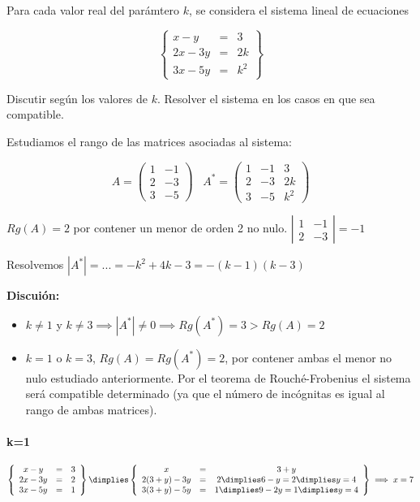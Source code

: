 \documentclass[palatino,nosec,nochap,nobuilddate]{Docencia}
\begin{document}
\begin{problem}[1]
Para cada valor real del parámtero $k$, se considera el sistema lineal de ecuaciones 

\[
\left\{\begin{array}{ccc}
x-y&=&3\\
2x-3y&=& 2k\\
3x-5y&=&k^2
\end{array}\right\}
\]

\ppart Discutir según los valores de $k$.
\ppart Resolver el sistema en los casos en que sea compatible.
\solution

\spart 
Estudiamos el rango de las matrices asociadas al sistema:

\[
A=\begin{pmatrix}1&-1\\2&-3\\3&-5\end{pmatrix}\;\;\; A^* = \begin{pmatrix}1&-1&3\\2&-3&2k\\3&-5&k^2\end{pmatrix}\]

$Rg(A) = 2$ por contener un menor de orden 2 no nulo. $\left|\begin{matrix}1&-1\\2&-3\end{matrix}\right| = -1$

Resolvemos $|A^*| = ... = -k^2+4k-3 = -(k-1)(k-3)$

\textbf{Discuión:}
\begin{itemize}
	\item $k\neq1$ y $k\neq 3 \implies |A^*| \neq 0 \implies Rg(A^*) = 3 > Rg(A) = 2$
	\item $k=1$ o $k=3$, $Rg(A) = Rg(A^*) = 2$, por contener ambas el menor no nulo estudiado anteriormente.
	\subitem Por el teorema de Rouché-Frobenius el sistema será compatible determinado (ya que el número de incógnitas es igual al rango de ambas matrices). 
\end{itemize}

\spart 

\paragraph{k=1}

\[
\left\{\begin{array}{ccc}
x-y&=&3\\
2x-3y&=& 2\\
3x-5y&=&1
\end{array}\right\} \dimplies
\left\{\begin{array}{ccc}
x&=&3+y\\
2(3+y)-3y&=& 2 \dimplies 6-y=2\dimplies y=4\\
3(3+y)-5y&=&1 \dimplies 9-2y=1 \dimplies y=4
\end{array}\right\} \implies x=7
\]


\end{problem}
\end{document}
